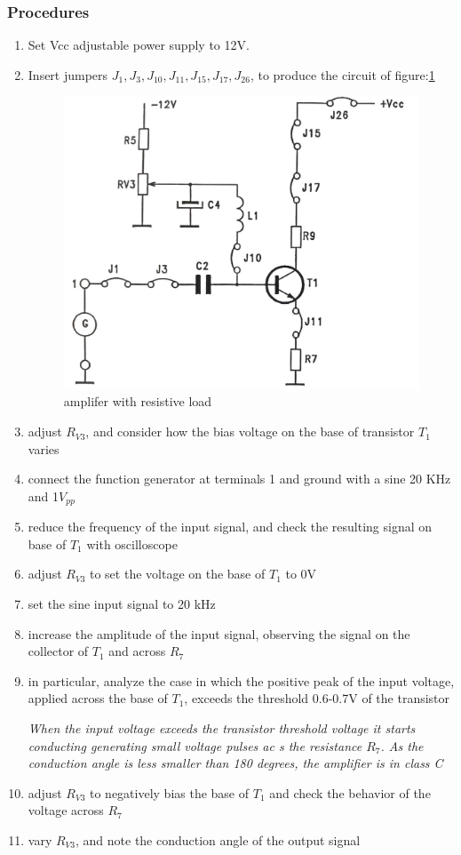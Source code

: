 \documentclass[12pt,a4paper]{article}
\begin{document}
    \subsubsection{Procedures}
    \begin{enumerate}
        \item Set Vcc adjustable power supply to 12V.
        \item Insert jumpers $J_1, J_3, J_{10}, J_{11}, J_{15}, J_{17}, J_{26}$, to produce the circuit of figure:\ref{fig:B32.2}
        \begin{figure}[H]
            \centering
            \includegraphics[width=0.5\linewidth]{analogue2_2.jpeg}
            \caption{amplifer with resistive load}
            \label{fig:B32.2}
        \end{figure}
        \item adjust $R_{V3}$, and consider how the bias voltage on the base of transistor $T_1$ varies
        \item connect the function generator at terminals 1 and ground with a sine 20 KHz and 1$V_{pp}$
        \item reduce the frequency of the input signal, and check the resulting signal on base of $T_1$ with oscilloscope
        \item adjust $R_{V3}$ to set the voltage on the base of $T_1$ to 0V
        \item set the sine input signal to 20 kHz
        \item increase the amplitude of the input signal, observing the signal on the collector of $T_1$ and across $R_7$
        \item in particular, analyze the case in which the positive peak of the input voltage, applied across the base of $T_1$, exceeds the threshold 0.6-0.7V of the transistor
        
    \textit{When the input voltage exceeds the transistor threshold voltage it starts conducting generating small voltage pulses ac
    s the resistance $R_7$. As the conduction angle is less smaller than 180 degrees, the amplifier is in class C}

        \item adjust $R_{V3}$ to negatively bias the base of $T_1$ and check the behavior of the voltage across $R_7$
        \item vary $R_{V3}$, and note the conduction angle of the output signal
    \end{enumerate}
\end{document}
